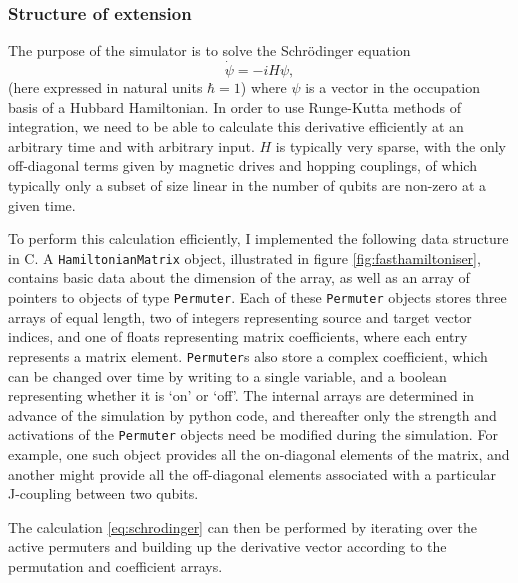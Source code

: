\documentclass{report}
\begin{document}
\begin{appendices}
\subsubsection{Structure of extension}
The purpose of the simulator is to solve the Schrödinger equation
\begin{equation} \label{eq:schrodinger}
    \dot{\psi} = -i H \psi,
\end{equation} (here expressed in natural units $\hbar = 1$) where $\psi$ is a vector in the occupation basis of a Hubbard Hamiltonian. In order to use Runge-Kutta \cite{Butcher1996} methods of integration, we need to be able to calculate this derivative efficiently at an arbitrary time and with arbitrary input. $H$ is typically very sparse, with the only off-diagonal terms given by magnetic drives and hopping couplings, of which typically only a subset of size linear in the number of qubits are non-zero at a given time. 

To perform this calculation efficiently, I implemented the following data structure in C. A \texttt{HamiltonianMatrix} object, illustrated in figure \ref{fig:fasthamiltoniser}, contains basic data about the dimension of the array, as well as an array of pointers to objects of type \texttt{Permuter}. Each of these \texttt{Permuter} objects stores three arrays of equal length, two of integers representing source and target vector indices, and one of floats representing matrix coefficients, where each entry represents a matrix element. \texttt{Permuter}s also store a complex coefficient, which can be changed over time by writing to a single variable, and a boolean representing whether it is `on' or `off'. The internal arrays are determined in advance of the simulation by python code, and thereafter only the strength and activations of the \texttt{Permuter} objects need be modified during the simulation. For example, one such object provides all the on-diagonal elements of the matrix, and another might provide all the off-diagonal elements associated with a particular J-coupling between two qubits.

The calculation \ref{eq:schrodinger} can then be performed by iterating over the active permuters and building up the derivative vector according to the permutation and coefficient arrays. 

\end{appendices}
\end{document}
